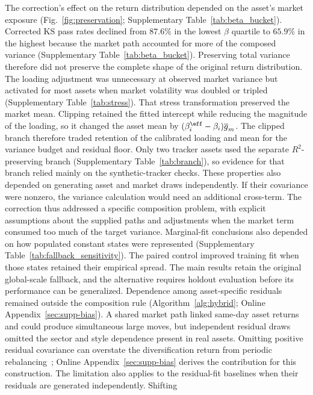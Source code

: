 The correction's effect on the return distribution depended on the
asset's market exposure (Fig.~\ref{fig:preservation};
Supplementary Table~\ref{tab:beta_bucket}). Corrected KS pass rates declined from
$87.6\%$ in the lowest $\beta$ quartile to $65.9\%$ in the highest
because the market path accounted for more of the composed variance
(Supplementary Table~\ref{tab:beta_bucket}). Preserving total variance therefore
did not preserve the complete shape of the original return
distribution. The loading adjustment was unnecessary at observed
market variance but activated for most assets when market volatility
was doubled or tripled (Supplementary Table~\ref{tab:stress}). That stress
transformation preserved the market mean. Clipping retained the
fitted intercept while reducing the magnitude of the loading, so it
changed the asset mean by
$(\beta_i^{\eff}-\beta_i)\overline{g}_m$. The clipped branch therefore
traded retention of the calibrated loading and mean for the
variance budget and residual floor. Only two tracker
assets used the separate $R^2$-preserving branch
(Supplementary Table~\ref{tab:branch}), so evidence for that branch relied mainly
on the synthetic-tracker checks. These properties also depended on
generating asset and market draws independently. If their covariance
were nonzero, the variance calculation would need an additional
cross-term. The correction thus addressed a specific composition
problem, with explicit assumptions about the supplied paths and
adjustments when the market term consumed too much of the target
variance.
Marginal-fit conclusions also depended on how populated constant
states were represented (Supplementary Table~\ref{tab:fallback_sensitivity}). The paired control improved training fit
when those states retained their empirical spread. The main results
retain the original global-scale fallback, and the alternative
requires holdout evaluation before its performance can be generalized.
Dependence among asset-specific residuals remained outside the
composition rule (Algorithm~\ref{alg:hybrid}; Online
Appendix~\ref{sec:supp-bias}). A shared market path linked same-day asset returns and
could produce simultaneous large moves, but independent residual
draws omitted the sector and style dependence present in real assets.
Omitting positive residual covariance can overstate the diversification
return from periodic rebalancing~\cite{boothFama1992,
boucheyNemtchinovWong2015, markowitz1976longRun}; Online
Appendix~\ref{sec:supp-bias} derives the contribution for this
construction. The limitation also applies to the residual-fit
baselines when their residuals are generated independently. Shifting

